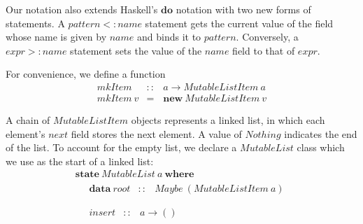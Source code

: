 \documentclass[runningheads,a4paper]{llncs}
\begin{document}
Our notation also extends Haskell's $\mathbf{do}$ notation with two new forms of statements. A $\mathit{pattern} <: \mathit{name}$ statement gets the current value of the field whose name is given by $\mathit{name}$ and binds it to $\mathit{pattern}$. Conversely, a $\mathit{expr} >: \mathit{name}$ statement sets the value of the $\mathit{name}$ field to that of $\mathit{expr}$.

For convenience, we define a function
\begin{displaymath}
\begin{array}{lcl}
\mathit{mkItem} & :: & a \to \mathit{MutableListItem}~a \\
\mathit{mkItem}~v & = & \mathbf{new}~\mathit{MutableListItem}~v
\end{array}
\end{displaymath}

A chain of $\mathit{MutableListItem}$ objects represents a linked list, in which each element's $\mathit{next}$ field stores the next element. A value of $\mathit{Nothing}$ indicates the end of the list. To account for the empty list, we declare a $\mathit{MutableList}$ class which we use as the start of a linked list:
\begin{displaymath}
\begin{array}{l}
\mathbf{state}~\mathit{MutableList}~a~\mathbf{where} \\
\quad \begin{array}{lcl}
\mathbf{data}~\mathit{root}  & :: & \mathit{Maybe}~(\mathit{MutableListItem}~a)
\end{array}\\\\
\quad \begin{array}{lcl}
\mathit{insert} & :: & a \to () %
\end{array}
\end{array}
\end{displaymath}
\end{document}
